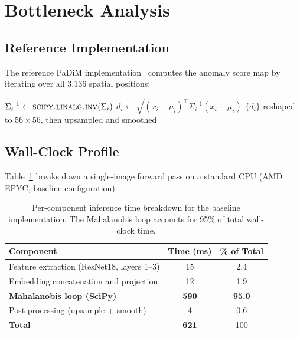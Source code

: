 \documentclass[blind]{gtac}
\begin{document}
\section{Bottleneck Analysis}
\label{sec:analysis}

\subsection{Reference Implementation}

The reference PaDiM implementation~\cite{padim_repo} computes the anomaly score
map by iterating over all 3{,}136 spatial positions:

\begin{algorithm}[H]
\footnotesize
\caption{Mahalanobis computation in the reference PaDiM implementation}
\label{alg:baseline}
\begin{algorithmic}[1]
  \State $\Sigma_i^{-1} \gets \Call{scipy.linalg.inv}{\Sigma_i}$
  \State $d_i \gets \sqrt{(x_i - \mu_i)^\top \Sigma_i^{-1} (x_i - \mu_i)}$
\EndFor
\State \Return $\{d_i\}$ reshaped to $56\!\times\!56$, then upsampled and smoothed
\end{algorithmic}
\end{algorithm}

\subsection{Wall-Clock Profile}

Table~\ref{tab:profile} breaks down a single-image forward pass on a standard
CPU (AMD EPYC, baseline configuration).

\begin{table}[H]
\centering
\caption{Per-component inference time breakdown for the baseline implementation.
The Mahalanobis loop accounts for 95\% of total wall-clock time.}
\label{tab:profile}
\footnotesize
\begin{tabular}{@{}lcc@{}}
\toprule
Component & Time (ms) & \% of Total \\
\midrule
Feature extraction (ResNet18, layers 1--3) & 15  & 2.4  \\
Embedding concatenation and projection     & 12  & 1.9  \\
\textbf{Mahalanobis loop (SciPy)}          & \textbf{590} & \textbf{95.0} \\
Post-processing (upsample + smooth)        &  4  & 0.6  \\
\midrule
\textbf{Total}                             & \textbf{621} & 100  \\
\bottomrule
\end{tabular}
\end{table}
\end{document}
